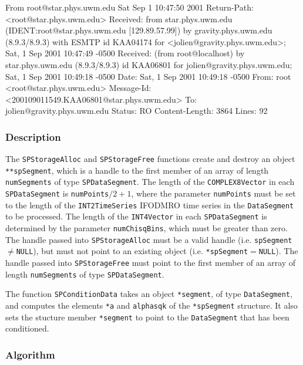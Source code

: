 From root@star.phys.uwm.edu  Sat Sep  1 10:47:50 2001
Return-Path: <root@star.phys.uwm.edu>
Received: from star.phys.uwm.edu (IDENT:root@star.phys.uwm.edu [129.89.57.99])
	by gravity.phys.uwm.edu (8.9.3/8.9.3) with ESMTP id KAA04174
	for <jolien@gravity.phys.uwm.edu>; Sat, 1 Sep 2001 10:47:49 -0500
Received: (from root@localhost)
	by star.phys.uwm.edu (8.9.3/8.9.3) id KAA06801
	for jolien@gravity.phys.uwm.edu; Sat, 1 Sep 2001 10:49:18 -0500
Date: Sat, 1 Sep 2001 10:49:18 -0500
From: root <root@star.phys.uwm.edu>
Message-Id: <200109011549.KAA06801@star.phys.uwm.edu>
To: jolien@gravity.phys.uwm.edu
Status: RO
Content-Length: 3864
Lines: 92

\subsubsection*{Description}
The \verb|SPStorageAlloc| and \verb|SPStorageFree| functions create and 
destroy an object \verb|**spSegment|, which is a handle to the first 
member of an array of length \verb|numSegments| of type \verb|SPDataSegment|.
The length of the \verb|COMPLEX8Vector| in each \verb|SPDataSegment| is
\verb|numPoints|$/2 +1$, where the parameter \verb|numPoints| must be set 
to the length of the \verb|INT2TimeSeries| IFODMRO time series in the 
\verb|DataSegment| to be processed.
The length of the \verb|INT4Vector| in each \verb|SPDataSegment| is 
determined by the parameter \verb|numChisqBins|, which must be greater
than zero.
The handle passed into \verb|SPStorageAlloc| must be a valid handle (i.e. 
\verb|spSegment|$\neq$\verb|NULL|), but must not point to an existing
object (i.e. \verb|*spSegment|$=$\verb|NULL|).
The handle passed into \verb|SPStorageFree| must point to the first
member of an array of length \verb|numSegments| of type \verb|SPDataSegment|.

The function \verb|SPConditionData| takes an object \verb|*segment|, of type
\verb|DataSegment|, and computes the elements \verb|*a| and \verb|alphasqk| of 
the \verb|*spSegment| structure. It also sets the stucture member \verb|*segment| 
to point to the \verb|DataSegment| that has been conditioned.

\subsubsection*{Algorithm}

